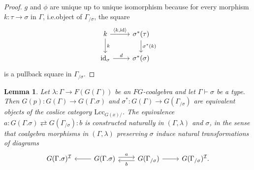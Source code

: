 \documentclass[a4paper]{article}
\newtheorem{lemma}[theorem]{Lemma}
\theoremstyle{remark}
\theoremstyle{definition}
\begin{document}
\begin{proof}
  $g$ and $\phi$ are unique up to unique isomorphism because for every morphism $k : \tau \rightarrow \sigma$ in $\Gamma$, i.e.\@ object of $\Gamma_{/ \sigma}$, the square
  \begin{equation}
    \begin{tikzcd}
      k \arrow[r, "{\langle k, \mathrm{id} \rangle}"] \arrow[d, "k"] & \sigma^*(\tau) \arrow[d, "\sigma^*(k)"] \\
      \mathrm{id}_\sigma \arrow[r, "d"] & \sigma^*(\sigma)
    \end{tikzcd}
  \end{equation}
  is a pullback square in $\Gamma_{/ \sigma}$.
\end{proof}

\begin{lemma}
  \label{lem:extension-vs-slice}
  Let $\lambda : \Gamma \rightarrow F(G(\Gamma))$ be an $FG$-coalgebra and let $\Gamma \vdash \sigma$ be a type.
  Then $G(p) : G(\Gamma) \rightarrow G(\Gamma.\sigma)$ and $\sigma^* : G(\Gamma) \rightarrow G(\Gamma_{/ \sigma})$ are equivalent objects of the coslice category $\mathrm{Lcc}_{G(x) /}$.
  The equivalence $a : G(\Gamma.\sigma) \rightleftarrows G(\Gamma_{/ \sigma}) : b$ is constructed naturally in $(\Gamma, \lambda)$ and $\sigma$, in the sense that coalgebra morphisms in $(\Gamma, \lambda)$ preserving $\sigma$ induce natural transformations of diagrams
  \begin{equation}
    \label{eq:ext-equivalence}
    \begin{tikzcd}
      G(\Gamma.\sigma)^\mathcal{I} & G(\Gamma.\sigma) \arrow[r, shift left, "a"] \arrow[l] & G(\Gamma_{/ \sigma}) \arrow[l, shift left, "b"] \arrow[r] & G(\Gamma_{/ \sigma})^\mathcal{I}.
    \end{tikzcd}
  \end{equation}
\end{lemma}
\end{document}
